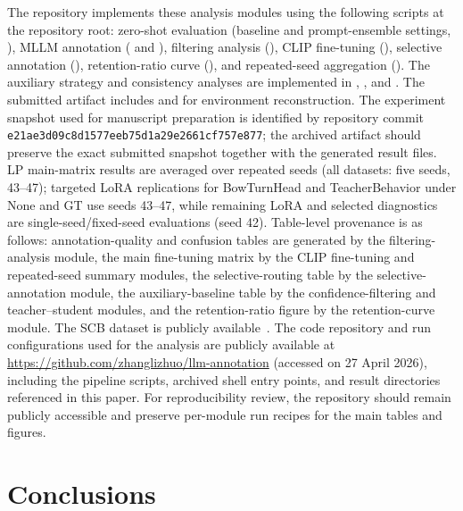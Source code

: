 \documentclass{ieeeaccess}
\begin{document}
The repository implements these analysis modules using the following
scripts at the repository root:
zero-shot evaluation (baseline and prompt-ensemble settings,
),
MLLM annotation ( and
),
filtering analysis (),
CLIP fine-tuning (),
selective annotation (),
retention-ratio curve (), and
repeated-seed aggregation ().
The auxiliary strategy and consistency analyses are implemented in
,
, and
.
The submitted artifact includes  and
 for environment reconstruction. The experiment
snapshot used for manuscript preparation is identified by repository
commit \texttt{e21ae3d09c8d1577eeb75d1a29e2661cf757e877}; the archived
artifact should preserve the exact submitted snapshot together with the
generated result files.
LP main-matrix results are averaged over repeated seeds (all
datasets: five seeds, 43--47); targeted LoRA replications for BowTurnHead and
TeacherBehavior under None and GT use seeds 43--47, while remaining
LoRA and selected diagnostics are single-seed/fixed-seed evaluations
(seed 42).
Table-level provenance is as follows: annotation-quality and confusion
tables are generated by the filtering-analysis module, the main
fine-tuning matrix by the CLIP fine-tuning and repeated-seed summary
modules, the selective-routing table by the selective-annotation
module, the auxiliary-baseline table by the confidence-filtering and
teacher--student modules, and the retention-ratio figure by the
retention-curve module.
The SCB dataset is publicly available~\cite{scb_dataset}.
The code repository and run configurations used for the analysis are
publicly available at \url{https://github.com/zhanglizhuo/llm-annotation}
(accessed on 27 April 2026), including the pipeline scripts, archived
shell entry points, and result directories referenced in this paper.
For reproducibility review, the repository should remain publicly
accessible and preserve per-module run recipes for the main tables and
figures.

\section{Conclusions}
\label{sec:conclusions}
\end{document}

